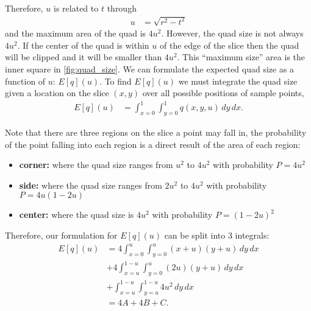 Therefore, $u$ is related to $t$ through
\begin{align}
  u &= \sqrt{r^2-t^2} \label{eq:u_to_t}
\end{align}
and the
maximum area of the quad is $4u^2$.  However, the quad size is not always
$4u^2$.   If the center of the quad is within $u$ of the edge of the slice
then the quad will be clipped and it will be smaller than $4u^2$.
This ``maximum size'' area is the inner square in \autoref{fig:quad_size}.
We can formulate the expected quad size as a function of $u$: $E[q](u)$.
To find $E[q](u)$ we must integrate the quad size given a location on 
the slice $(x,y)$ over all possible positions of sample points,
\begin{align*}
  E[q](u) &= \int_{x=0}^1 \int_{y=0}^1 q(x, y, u) \, dy \, dx
  \text{.}
\end{align*}

Note that there are three regions on the slice a point may fall in,
the probability of the point falling into each region is a direct result
of the area of each region:

\begin{itemize}
\item \textbf{corner:} where the quad size ranges from $u^2$ to $4u^2$
                    with probability $P = 4u^2$
\item \textbf{side:}   where the quad size ranges from $2u^2$ to $4u^2$ 
                    with probability $P = 4u(1-2u)$
\item \textbf{center:} where the quad size is $4u^2$
                    with probability $P = (1-2u)^2$
\end{itemize}

Therefore, our formulation for $E[q](u)$ can be split into 3 integrals:
\begin{align*}
  E[q](u) &=   4 \int_{x=0}^u \int_{y=0}^u (x+u)(y+u) \, dy \, dx     \\
           & + 4 \int_{x=u}^{1-u} \int_{y=0}^u (2u)(y+u) \, dy \, dx \\
           & + \int_{x=u}^{1-u} \int_{y=u}^{1-u} 4u^2 \, dy \, dx    \\
          &= 4A + 4B + C
          \text{.}
\end{align*}

